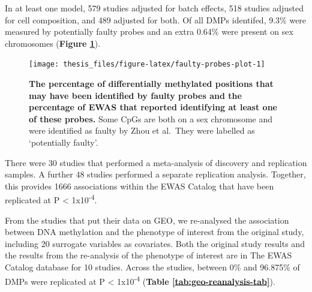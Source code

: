 \documentclass[11pt,oneside]{bristolthesis}
\begin{document}
In at least one model, 579 studies adjusted for batch effects, 518 studies adjusted for cell composition, and 489 adjusted for both. Of all DMPs identifed, 9.3\% were measured by potentially faulty probes and an extra 0.64\% were present on sex chromosomes (\textbf{Figure \ref{fig:faulty-probes-plot}}).


\begin{figure}

{\centering \texttt{[image: thesis\_files/figure-latex/faulty-probes-plot-1]} 

}

\caption{\textbf{The percentage of differentially methylated positions that may have been identified by faulty probes and the percentage of EWAS that reported identifying at least one of these probes.} Some CpGs are both on a sex chromosome and were identified as faulty by Zhou et al.~They were labelled as `potentially faulty'.}\label{fig:faulty-probes-plot}
\end{figure}
There were 30 studies that performed a meta-analysis of discovery and replication samples. A further 48 studies performed a separate replication analysis. Together, this provides 1666 associations within the EWAS Catalog that have been replicated at P \textless{} 1x10\textsuperscript{-4}.

From the studies that put their data on GEO, we re-analysed the association between DNA methylation and the phenotype of interest from the original study, including 20 surrogate variables as covariates. Both the original study results and the results from the re-analysis of the phenotype of interest are in The EWAS Catalog database for 10 studies. Across the studies, between 0\% and 96.875\% of DMPs were replicated at P \textless{} 1x10\textsuperscript{-4} (\textbf{Table \ref{tab:geo-reanalysis-tab}}). \linebreak
\begin{table}[!h]

\caption{\label{tab:geo-reanalysis-tab}GEO re-analysis replication}
\centering
{}
\end{table}
\linebreak
\end{document}
